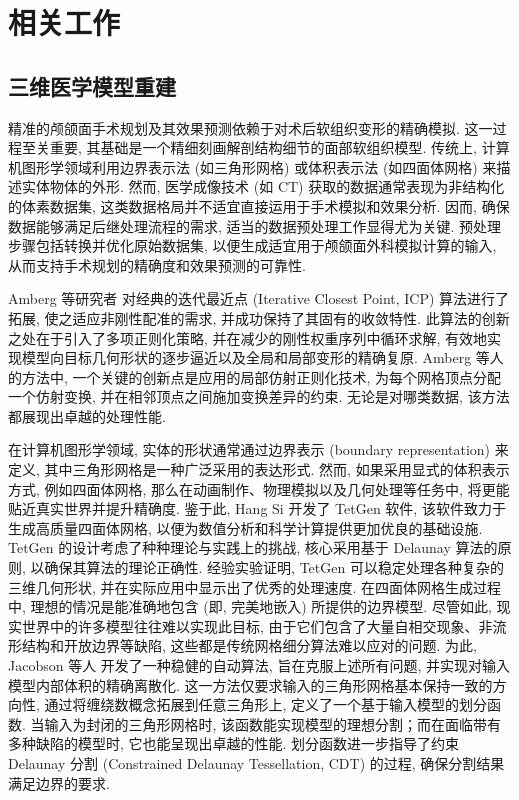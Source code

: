 
\chapter{相关工作}
\label{cha:related-work}

\section{三维医学模型重建}

精准的颅颌面手术规划及其效果预测依赖于对术后软组织变形的精确模拟.
这一过程至关重要, 其基础是一个精细刻画解剖结构细节的面部软组织模型.
传统上, 计算机图形学领域利用边界表示法 (如三角形网格) 或体积表示法 (如四面体网格) 来描述实体物体的外形.
然而, 医学成像技术 (如 CT) 获取的数据通常表现为非结构化的体素数据集, 这类数据格局并不适宜直接运用于手术模拟和效果分析.
因而, 确保数据能够满足后继处理流程的需求, 适当的数据预处理工作显得尤为关键.
预处理步骤包括转换并优化原始数据集, 以便生成适宜用于颅颌面外科模拟计算的输入, 从而支持手术规划的精确度和效果预测的可靠性.

Amberg 等研究者 \cite{ambergOptimalStepNonrigid2007} 对经典的迭代最近点 (Iterative Closest Point, ICP) 算法进行了拓展, 使之适应非刚性配准的需求, 并成功保持了其固有的收敛特性.
此算法的创新之处在于引入了多项正则化策略, 并在减少的刚性权重序列中循环求解, 有效地实现模型向目标几何形状的逐步逼近以及全局和局部变形的精确复原.
Amberg 等人的方法中, 一个关键的创新点是应用的局部仿射正则化技术, 为每个网格顶点分配一个仿射变换, 并在相邻顶点之间施加变换差异的约束.
无论是对哪类数据, 该方法都展现出卓越的处理性能.

在计算机图形学领域, 实体的形状通常通过边界表示 (boundary representation) 来定义, 其中三角形网格是一种广泛采用的表达形式.
然而, 如果采用显式的体积表示方式, 例如四面体网格, 那么在动画制作、物理模拟以及几何处理等任务中, 将更能贴近真实世界并提升精确度.
鉴于此, Hang Si \cite{siTetGenDelaunaybasedQuality2015} 开发了 TetGen 软件, 该软件致力于生成高质量四面体网格, 以便为数值分析和科学计算提供更加优良的基础设施.
TetGen 的设计考虑了种种理论与实践上的挑战, 核心采用基于 Delaunay 算法的原则, 以确保其算法的理论正确性.
经验实验证明, TetGen 可以稳定处理各种复杂的三维几何形状, 并在实际应用中显示出了优秀的处理速度.
在四面体网格生成过程中, 理想的情况是能准确地包含 (即, 完美地嵌入) 所提供的边界模型.
尽管如此, 现实世界中的许多模型往往难以实现此目标, 由于它们包含了大量自相交现象、非流形结构和开放边界等缺陷, 这些都是传统网格细分算法难以应对的问题.
为此, Jacobson 等人 \cite{jacobsonRobustInsideoutsideSegmentation2013} 开发了一种稳健的自动算法, 旨在克服上述所有问题, 并实现对输入模型内部体积的精确离散化.
这一方法仅要求输入的三角形网格基本保持一致的方向性, 通过将缠绕数概念拓展到任意三角形上, 定义了一个基于输入模型的划分函数.
当输入为封闭的三角形网格时, 该函数能实现模型的理想分割；而在面临带有多种缺陷的模型时, 它也能呈现出卓越的性能.
划分函数进一步指导了约束 Delaunay 分割 (Constrained Delaunay Tessellation, CDT) 的过程, 确保分割结果满足边界的要求.

